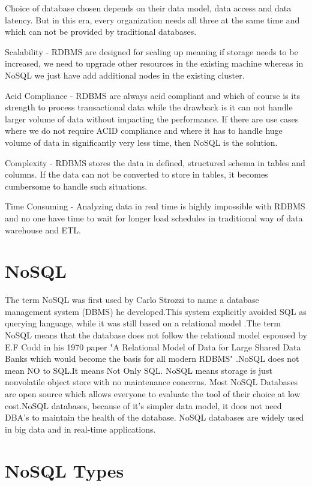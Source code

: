 \documentclass[sigconf]{acmart}
\begin{document}
Choice of database chosen depends on their data model, data access and data latency. But in this era, every organization needs all three at the same time and which can not be provided by traditional databases.

Scalability - RDBMS are designed for scaling up meaning if storage needs to be increased, we need to upgrade other resources in the existing machine whereas in NoSQL we just have add additional nodes in the existing cluster. 

Acid Compliance - RDBMS are always acid compliant and which of course is its strength to process transactional data while the drawback is it can not handle larger volume of data without impacting the performance. If there are use cases where we do not require ACID compliance and  where it has to handle huge volume of data in significantly very less time, then NoSQL is the solution.

Complexity - RDBMS stores the data in defined, structured schema in tables and columns. If the data can not be converted to store in tables, it becomes cumbersome to handle such situations. 

Time Consuming - Analyzing data in real time is highly impossible with RDBMS and no one have time to wait for longer load schedules in traditional way of data warehouse and ETL.

\section{NoSQL}

The term NoSQL was first used by Carlo Strozzi to name a database management system (DBMS) he developed.This system explicitly avoided SQL as querying language, while it was still based on a relational model \cite{seasupenn}.The term NoSQL means that the database does not follow the relational model espoused by E.F Codd in his 1970 paper "A Relational Model of Data for Large Shared Data Banks which would become the basis for all modern RDBMS" \cite{rdbms}.NoSQL does not mean NO to SQL.It means Not Only SQL. NoSQL means storage is just nonvolatile object store with no maintenance concerns. Most NoSQL Databases are open source which allows everyone to evaluate the tool of their choice at low cost.NoSQL databases, because of it's simpler data model, it does not need DBA's to maintain the health of the database. NoSQL databases are widely used in big data and in real-time  applications.  

\section{NoSQL Types}
\end{document}
